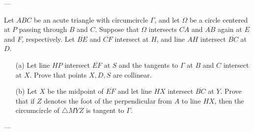 
---

Let $ABC$ be an acute triangle with circumcircle $\Gamma$, and let $\Omega$ be a circle centered at $P$ passing through $B$ and $C$. Suppose that $\Omega$ intersects $\overline{CA}$ and $\overline{AB}$ again at $E$ and $F$, respectively. Let $\overline{BE}$ and $\overline{CF}$ intersect at $H$, and line $AH$ intersect $\overline{BC}$ at $D$.
\begin{itemize}
    \item[(a)] Let line $HP$ intersect $\overline{EF}$ at $S$ and the tangents to $\Gamma$ at $B$ and $C$ intersect at $X$. Prove that points $X,D,S$ are collinear.
        \vspace{-0.5em}
    \item[(b)] Let $X$ be the midpoint of $\overline{EF}$ and let line $HX$ intersect $\overline{BC}$ at $Y$. Prove that if $Z$ denotes the foot of the perpendicular from $A$ to line $HX$, then the circumcircle of $\triangle MYZ$ is tangent to $\Gamma$.
\end{itemize}

---

